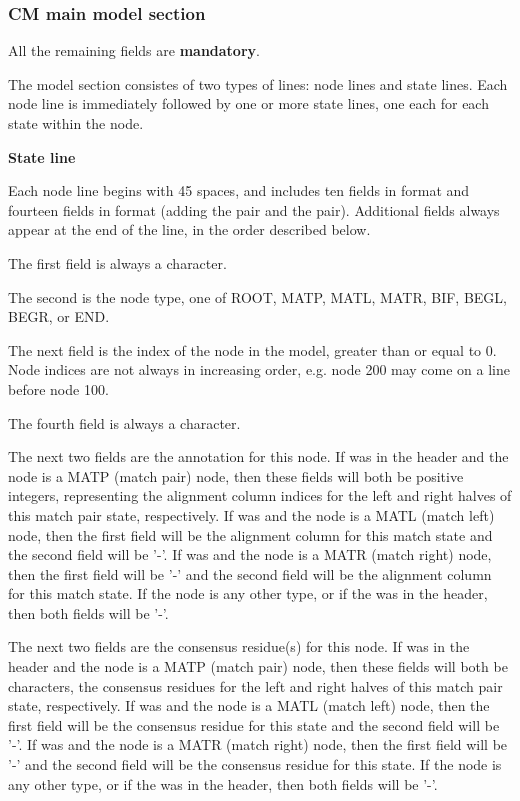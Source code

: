 \subsubsection{CM main model section}

All the remaining fields are \textbf{mandatory}.

The model section consistes of two types of lines: node lines and
state lines. Each node line is immediately followed by one or more
state lines, one each for each state within the node. 

\begin{sreitems}{\textbf{State line}}

\item [\textbf{Node line}] Each node line begins with 45 spaces, and
  includes ten fields in  format and fourteen
  fields in  format (adding the 
  pair and the  pair). Additional fields always appear at
  the end of the line, in the order described below.

  The first field is always a \prog{[} character.

  The second is the node type, one of ROOT, MATP, MATL, MATR, BIF,
  BEGL, BEGR, or END. 

  The next field is the index of the node in the
  model, greater than or equal to 0. Node indices are not always in
  increasing order, e.g. node 200 may come on a line before node 100.

  The fourth field is always a \prog{]} character. 

  The next two fields are the  annotation for this node. If
   was  in the header and the node is a MATP
  (match pair) node, then these fields will both be positive integers,
  representing the alignment column indices for the left and right
  halves of this match pair state, respectively. If  was
   and the node is a MATL (match left) node, then the first
  field will be the alignment column for this match state and the
  second field will be '-'. If  was
   and the node is a MATR (match right) node, then the first
  field will be '-' and the second field will be the alignment column
  for this match state. If the node is any other type, or if the
   was  in the header, then both fields will be '-'.

  The next two fields are the  consensus residue(s) for
  this node. If  was  in the header and the node
  is a MATP (match pair) node, then these fields will both be
  characters, the consensus residues for the left and right halves of
  this match pair state, respectively. If  was 
  and the node is a MATL (match left) node, then the first field will
  be the consensus residue for this state and the second field will be
  '-'. If  was  and the node is a MATR (match
  right) node, then the first field will be '-' and the second field
  will be the consensus residue for this state. If the node is
  any other type, or if the  was  in the header,
  then both fields will be '-'.


\end{sreitems}
